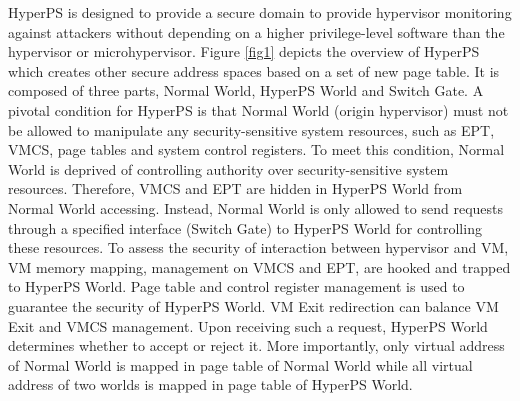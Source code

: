 ﻿\documentclass[conference]{IEEEtran}
\begin{document}

HyperPS is designed to provide a secure domain to provide hypervisor monitoring against attackers without depending on a higher privilege-level software than the hypervisor or microhypervisor. 
Figure \ref{fig1} depicts the overview of HyperPS which creates other secure address spaces based on a set of new page table. It is composed of three parts, Normal World, HyperPS World and Switch Gate. 
A pivotal condition for HyperPS is that Normal World (origin hypervisor) must not be allowed to manipulate any security-sensitive system resources, such as EPT, VMCS, page tables and system control registers.
To meet this condition, Normal World is deprived of controlling authority over security-sensitive system resources. Therefore, VMCS and EPT are hidden in HyperPS World from Normal World accessing. Instead, Normal World is only allowed to send requests through a specified interface (Switch Gate) to HyperPS World for controlling these resources.
 To assess the security of interaction between hypervisor and VM, VM memory mapping, management on VMCS and EPT, are hooked and trapped to HyperPS World. Page table and control register management is used to guarantee the security of HyperPS World.
VM Exit redirection can balance VM Exit and VMCS management. Upon receiving such a request, HyperPS World determines whether to accept or reject it. More importantly, only virtual address of Normal World is mapped in page table of Normal World while all virtual address of two worlds is mapped in page table of HyperPS World.

%
\end{document}
